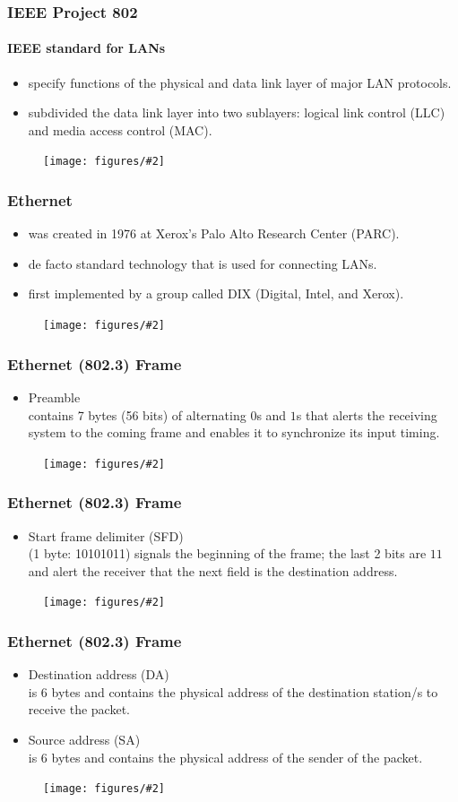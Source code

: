 \documentclass{beamer}
\newcommand{\fig}[2]{
\begin{center}
\begin{figure}
\texttt{[image: figures/\#2]}
\end{figure}
\end{center}
}
\begin{document}
\begin{frame}
\frametitle{\huge IEEE Project 802}
\framesubtitle{IEEE standard for LANs}
\begin{itemize} 
\Large
\item <1-> specify functions of the physical and data link layer of major LAN protocols.
\item <2-> subdivided the data link layer into two sublayers: logical link control (LLC) and media access control (MAC).
\end{itemize}
\fig{0.55}{network_802}
\end{frame}


\begin{frame}
\frametitle{Ethernet} 
\begin{itemize} 
\Large
\item <1-> was created in 1976 at Xerox's Palo Alto Research Center (PARC). 
\item <2-> de facto standard technology that is used for connecting LANs.
\item <3-> first implemented by a group called DIX (Digital, Intel, and Xerox). 
\end{itemize}
\fig{0.6}{network_etherevolution}
\end{frame}


\begin{frame}
\frametitle{\huge Ethernet (802.3) Frame} 
\begin{itemize} 
\Large
\item <1-> Preamble \\ contains 7 bytes (56 bits) of alternating $0$s and $1$s that alerts the receiving system to the coming frame and enables it to synchronize its input timing.
\end{itemize}
\fig{0.55}{network_etherframe}
\end{frame} 


\begin{frame}
\frametitle{\huge Ethernet (802.3) Frame} 
\begin{itemize} 
\Large
\item <1-> Start frame delimiter (SFD) \\ (1 byte: 10101011) signals the beginning of the frame; the last 2 bits are $11$ and alert the receiver that the next field is the destination address.
\end{itemize}
\fig{0.55}{network_etherframe}
\end{frame} 
 

\begin{frame}
\frametitle{\huge Ethernet (802.3) Frame} 
\begin{itemize} 
\Large
\item <1-> Destination address (DA) \\ is 6 bytes and contains the physical address of the destination station/s to receive the packet.
\item <2-> Source address (SA) \\ is 6 bytes and contains the physical address of the sender of the packet.
\end{itemize}
\fig{0.55}{network_etherframe}
\end{frame} 
\end{document}
